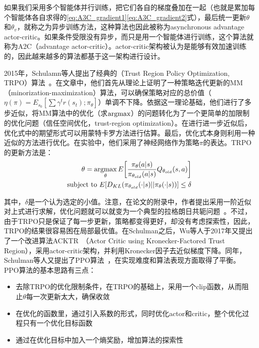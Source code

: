       \par 如果我们采用多个智能体并行训练，把它们各自的梯度叠加在一起（也就是累加每个智能体各自求得的\eqref{eq:A3C_gradient1}\eqref{eq:A3C_gradient2}式），最后统一更新$\theta$和$\theta_v$，就称之为异步训练方法，这种算法也因此被称为asynchronous advantage actor-critic。如果条件受限没有异步，而只是用一个智能体进行训练，这个算法就称为A2C（advantage actor-critic）。actor-critic架构被认为是能够有效加速训练的，因此越来越多的算法都基于这一架构进行设计。\par
      2015年，Schulamn等人提出了经典的（Trust Region Policy Optimization, TRPO）算法~\cite{TRPO}。在文章中，他们首先从理论上证明了一种策略迭代更新的MM（minorization-maximization）算法，可以确保策略对应的总价值（$\eta(\pi) = E_{s_0}[\sum \gamma^t r(s_t); \pi_\theta]$）单调不下降。依据这一理论基础，他们进行了多步近似，将MM算法中的优化（求$\operatorname*{argmax}$）的问题转化为了一个更简单的加限制的优化问题（信任空间优化，trust-region optimization）。在进行进一步近似后，优化式中的期望形式可以用蒙特卡罗方法进行估算。最后，优化式本身则利用一种近似的方法进行优化。在实验中，他们采用了神经网络作为策略$\pi$的表达。TRPO的更新方法是：
      \begin{align}
        \begin{aligned}
          \theta = \operatorname*{argmax}_\theta E\bigg[\frac{\pi_\theta(a|s)}{\pi_{\theta_{old}}(a|s)}Q_{\theta_{old}}(s, a)\bigg]\\
          \text{subject to } E[D_{KL}(\pi_{\theta_{old}}(\cdot|s)||\pi_\theta(\cdot|s))] \leq \delta
        \end{aligned}
      \end{align}
      \par 其中，$\delta$是一个认为选定的小值。注意，在论文的附录中，作者提出采用一阶近似对上式进行求解，优化问题就可以就变为一个典型的拉格朗日共轭问题~\cite{Convex_optimization_book}。不过，由于TRPO只是保证了每一步更新，策略都变得更好，却没有考虑探索性，因此，TRPO的结果很容易困在局部最优值。在Schulman之后，Wu等人于2017年又提出了一个改进算法ACKTR~\cite{ACKTR}（Actor Critic using Kronecker-Factored Trust Region），采用actor-critic架构，并利用Kronecker因子去近似梯度下降。同年，Schulman等人又提出了PPO算法~\cite{PPO}，在实现难度和算法表现方面取得了平衡。PPO算法的基本思路有三点：
      \begin{itemize}
        \item 去除TRPO的优化限制条件，在TRPO的基础上，采用一个clip函数，从而阻止$\theta$每一次更新太大，确保收敛
        \item 在优化的函数里，通过引入系数的形式，同时优化actor和critic，整个优化过程只有一个优化目标函数
        \item 通过在优化目标中加入一个熵奖励，增加算法的探索性
      \end{itemize}
